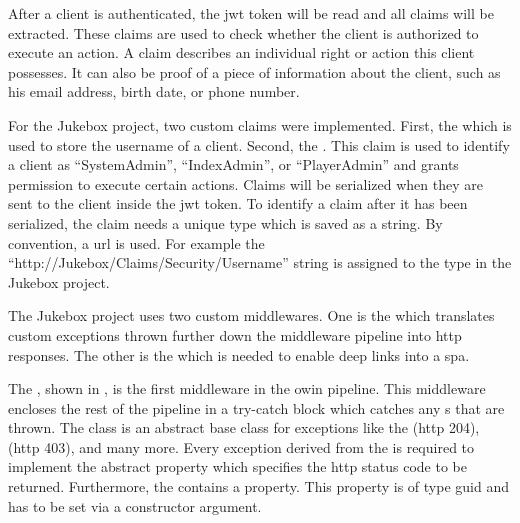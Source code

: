 

After a client is authenticated, the \gls{jwt} token will be read and all claims will be extracted. These claims are used to check whether the client is authorized to execute an action. A claim describes an individual right or action this client possesses. It can also be proof of a piece of information about the client, such as his email address, birth date, or phone number.

For the Jukebox project, two custom claims were implemented. First, the  which is used to store the username of a client. Second, the . This claim is used to identify a client as \enquote{SystemAdmin}, \enquote{IndexAdmin}, or \enquote{PlayerAdmin} and grants permission to execute certain actions. Claims will be serialized when they are sent to the client inside the \gls{jwt} token. To identify a claim after it has been serialized, the claim needs a unique type which is saved as a string. By convention, a \gls{url} is used. For example the \enquote{http://Jukebox/Claims/Security/Username} string is assigned to the  type in the Jukebox project. \cite{claimsBasedAuth}


The Jukebox project uses two custom middlewares. One is the  which translates custom exceptions thrown further down the middleware pipeline into \gls{http} responses. The other is the  which is needed to enable deep links into a \gls{spa}.


The , shown in , is the first middleware in the \gls{owin} pipeline. This middleware encloses the rest of the pipeline in a try-catch block which catches any s that are thrown. The  class is an abstract base class for exceptions like the  (\gls{http} 204),  (\gls{http} 403), and many more. Every exception derived from the  is required to implement the abstract  property which specifies the \gls{http} status code to be returned. Furthermore, the  contains a  property. This property is of type \gls{guid} and has to be set via a constructor argument.

